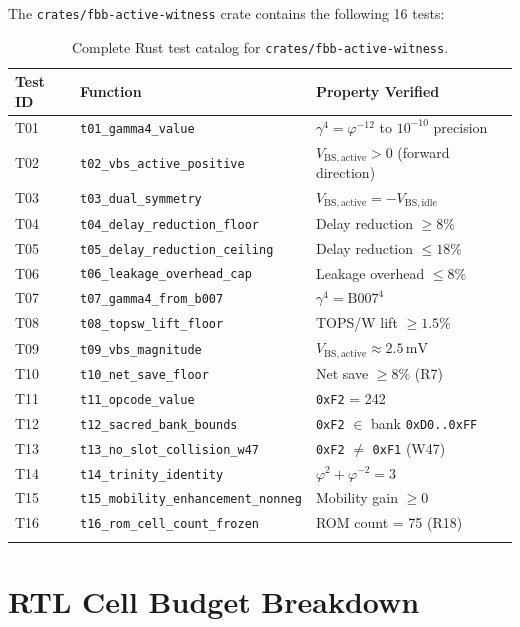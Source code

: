 \documentclass[12pt,a4paper]{report}
\theoremstyle{plain}
\theoremstyle{definition}
\theoremstyle{remark}
\newcommand{\opcode}[1]{\texttt{#1}}
\newcommand{\vbs}{V_{\mathrm{BS,active}}}
\newcommand{\gammaFour}{\gamma^{4}}
\begin{document}
The \texttt{crates/fbb-active-witness} crate contains the following 16 tests:

\begin{longtable}{llp{7cm}}
\toprule
Test ID & Function & Property Verified \\
\midrule
\endhead
T01 & \texttt{t01\_gamma4\_value} & $\gammaFour = \varphi^{-12}$ to $10^{-10}$ precision \\
T02 & \texttt{t02\_vbs\_active\_positive} & $\vbs > 0$ (forward direction) \\
T03 & \texttt{t03\_dual\_symmetry} & $\vbs = -V_{\mathrm{BS,idle}}$ \\
T04 & \texttt{t04\_delay\_reduction\_floor} & Delay reduction $\geq 8\%$ \\
T05 & \texttt{t05\_delay\_reduction\_ceiling} & Delay reduction $\leq 18\%$ \\
T06 & \texttt{t06\_leakage\_overhead\_cap} & Leakage overhead $\leq 8\%$ \\
T07 & \texttt{t07\_gamma4\_from\_b007} & $\gammaFour = \mathrm{B007}^{4}$ \\
T08 & \texttt{t08\_topsw\_lift\_floor} & TOPS/W lift $\geq 1.5\%$ \\
T09 & \texttt{t09\_vbs\_magnitude} & $\vbs \approx 2.5\,\mathrm{mV}$ \\
T10 & \texttt{t10\_net\_save\_floor} & Net save $\geq 8\%$ (R7) \\
T11 & \texttt{t11\_opcode\_value} & \opcode{0xF2} = 242 \\
T12 & \texttt{t12\_sacred\_bank\_bounds} & \opcode{0xF2} $\in$ bank \opcode{0xD0..0xFF} \\
T13 & \texttt{t13\_no\_slot\_collision\_w47} & \opcode{0xF2} $\neq$ \opcode{0xF1} (W47) \\
T14 & \texttt{t14\_trinity\_identity} & $\varphi^{2} + \varphi^{-2} = 3$ \\
T15 & \texttt{t15\_mobility\_enhancement\_nonneg} & Mobility gain $\geq 0$ \\
T16 & \texttt{t16\_rom\_cell\_count\_frozen} & ROM count = 75 (R18) \\
\bottomrule
\caption{Complete Rust test catalog for \texttt{crates/fbb-active-witness}.}
\label{tab:rust_tests}
\end{longtable}

\chapter{RTL Cell Budget Breakdown}
\label{app:rtl_budget}
\end{document}
